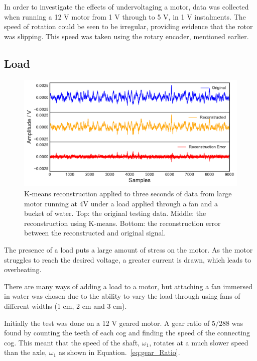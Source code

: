 
In order to investigate the effects of undervoltaging a motor, data was collected when running a 12 V motor from 1 V through to 5 V, in 1 V instalments. The speed of rotation could be seen to be irregular, providing evidence that the rotor was slipping. This speed was taken using the rotary encoder, mentioned earlier.


\subsection{Load}

\begin{figure}[t]
    \includegraphics[width=1.0\textwidth]{fig/kmeans_large_4Vwater.pdf}
    \caption[K-means Large Motor Reconstruction In Water]{K-means reconstruction applied to three seconds of data from large motor running at 4V under a load applied through a fan and a bucket of water. Top: the original testing data. Middle: the reconstruction using K-means. Bottom: the reconstruction error between the reconstructed and original signal.}
    \label{fig:kmeans_large4Vwater}
\end{figure}

The presence of a load puts a large amount of stress on the motor. As the motor struggles to reach the desired voltage, a greater current is drawn, which leads to overheating.
        
There are many ways of adding a load to a motor, but attaching a fan immersed in water was chosen due to the ability to vary the load through using fans of different widths (1 cm, 2 cm and 3 cm).
    
Initially the test was done on a 12 V geared motor. A gear ratio of ${5}/{288}$ was found by counting the teeth of each cog and finding the speed of the connecting cog. This meant that the speed of the shaft, $\omega_1$, rotates at a much slower speed than the axle, $\omega _1$ as shown in Equation.~\eqref{eq:gear_Ratio}.

